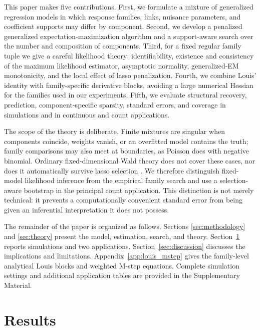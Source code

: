 \documentclass[11pt]{article}
\begin{document}
This paper makes five contributions.  First, we formulate a mixture of
generalized regression models in which response families, links, nuisance
parameters, and coefficient supports may differ by component.  Second, we
develop a penalized generalized expectation-maximization algorithm and a
support-aware search over
the number and composition of components.  Third, for a fixed regular family
tuple we give a careful likelihood theory: identifiability, existence and
consistency of the maximum likelihood estimator, asymptotic normality,
generalized-EM monotonicity, and the local effect of lasso penalization.  Fourth,
we combine Louis' identity \citep{louis1982information} with family-specific
derivative blocks, avoiding a large numerical Hessian for the families used in
our experiments.  Fifth, we evaluate structural recovery, prediction,
component-specific sparsity, standard errors, and coverage in simulations and
in continuous and count applications.

The scope of the theory is deliberate.  Finite mixtures are singular when
components coincide, weights vanish, or an overfitted model contains the truth;
family comparisons may also meet at boundaries, as Poisson does with negative
binomial.  Ordinary fixed-dimensional Wald theory does not cover these cases,
nor does it automatically survive lasso selection
\citep{knight2000asymptotics,drton2017sbic}.  We therefore distinguish
fixed-model likelihood inference from the empirical family search and use a
selection-aware bootstrap in the principal count application.  This distinction
is not merely technical: it prevents a computationally convenient standard
error from being given an inferential interpretation it does not possess.

The remainder of the paper is organized as follows.  Sections
\ref{sec:methodology} and \ref{sec:theory} present the model, estimation,
search, and theory.  Section~\ref{sec:results} reports simulations and two
applications.  Section~\ref{sec:discussion} discusses the implications and
limitations.  Appendix~\ref{app:louis_mstep} gives the family-level analytical
Louis blocks and weighted M-step equations.  Complete simulation settings and
additional application tables are provided in the Supplementary Material.



\section{Results}
\label{sec:results}
\end{document}
